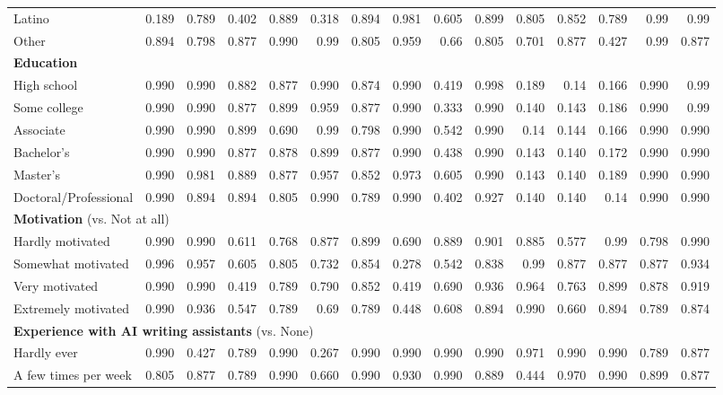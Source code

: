 \documentclass[11pt]{report}
\begin{document}
\begin{append}
\begin{landscape}
\begin{table}[]
\begin{tabular}{lrrrrrrrrrrrrrr}
Latino & 0.189 & 0.789 & 0.402 & 0.889 & 0.318 & 0.894 & 0.981 & 0.605 & 0.899 & 0.805 & 0.852 & 0.789 & 0.99 & 0.99 \\ 
Other & 0.894 & 0.798 & 0.877 & 0.990 & 0.99 & 0.805 & 0.959 & 0.66 & 0.805 & 0.701 & 0.877 & 0.427 & 0.99 & 0.877 \\ 
\midrule
\multicolumn{15}{l}{\textbf{Education}} \\[2.5pt] 
\midrule
High school & 0.990 & 0.990 & 0.882 & 0.877 & 0.990 & 0.874 & 0.990 & 0.419 & 0.998 & 0.189 & 0.14 & 0.166 & 0.990 & 0.99 \\ 
Some college & 0.990 & 0.990 & 0.877 & 0.899 & 0.959 & 0.877 & 0.990 & 0.333 & 0.990 & 0.140 & 0.143 & 0.186 & 0.990 & 0.99 \\ 
Associate  & 0.990 & 0.990 & 0.899 & 0.690 & 0.99 & 0.798 & 0.990 & 0.542 & 0.990 & 0.14 & 0.144 & 0.166 & 0.990 & 0.990 \\ 
Bachelor's  & 0.990 & 0.990 & 0.877 & 0.878 & 0.899 & 0.877 & 0.990 & 0.438 & 0.990 & 0.143 & 0.140 & 0.172 & 0.990 & 0.990\\ 
Master's & 0.990 & 0.981 & 0.889 & 0.877 & 0.957 & 0.852 & 0.973 & 0.605 & 0.990 & 0.143 & 0.140 & 0.189 & 0.990 & 0.990 \\ 
Doctoral/Professional & 0.990 & 0.894 & 0.894 & 0.805 & 0.990 & 0.789 & 0.990 & 0.402 & 0.927 & 0.140 & 0.140 & 0.14 & 0.990 & 0.990 \\ 
\midrule
\multicolumn{15}{l}{\textbf{Motivation} (vs. Not at all)} \\[2.5pt] 
\midrule
Hardly motivated & 0.990 & 0.990 & 0.611 & 0.768 & 0.877 & 0.899 & 0.690 & 0.889 & 0.901 & 0.885 & 0.577 & 0.99 & 0.798 & 0.990 \\ 
Somewhat motivated & 0.996 & 0.957 & 0.605 & 0.805 & 0.732 & 0.854 & 0.278 & 0.542 & 0.838 & 0.99 & 0.877 & 0.877 & 0.877 & 0.934 \\ 
Very motivated & 0.990 & 0.990 & 0.419 & 0.789 & 0.790 & 0.852 & 0.419 & 0.690 & 0.936 & 0.964 & 0.763 & 0.899 & 0.878 & 0.919 \\ 
Extremely motivated & 0.990 & 0.936 & 0.547 & 0.789 & 0.69 & 0.789 & 0.448 & 0.608 & 0.894 & 0.990 & 0.660 & 0.894 & 0.789 & 0.874 \\ 
\midrule
\multicolumn{15}{l}{\textbf{Experience with AI writing assistants} (vs. None)} \\[2.5pt] 
\midrule
Hardly ever & 0.990 & 0.427 & 0.789 & 0.990 & 0.267 & 0.990 & 0.990 & 0.990 & 0.990 & 0.971 & 0.990 & 0.990 & 0.789 & 0.877 \\ 
A few times per week & 0.805 & 0.877 & 0.789 & 0.990 & 0.660 & 0.990 & 0.930 & 0.990 & 0.889 & 0.444 & 0.970 & 0.990 & 0.899 & 0.877 \\ 

\end{tabular}
\end{table}
\end{landscape}
\end{append}
\end{document}
